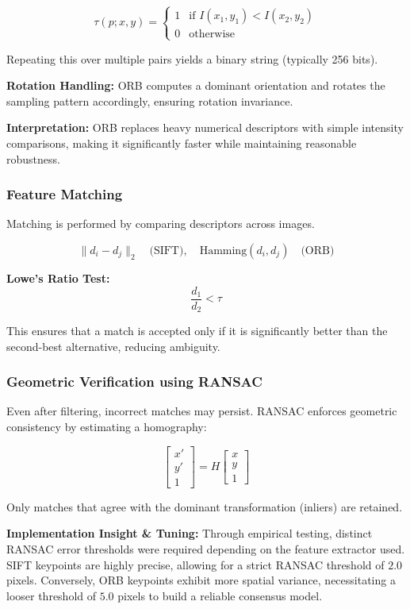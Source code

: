 \documentclass[conference]{IEEEtran}
\begin{document}
\[
\tau(p; x, y) =
\begin{cases}
1 & \text{if } I(x_1, y_1) < I(x_2, y_2) \\
0 & \text{otherwise}
\end{cases}
\]

Repeating this over multiple pairs yields a binary string (typically 256 bits).

\textbf{Rotation Handling:}  
ORB computes a dominant orientation and rotates the sampling pattern accordingly, ensuring rotation invariance.

\textbf{Interpretation:}  
ORB replaces heavy numerical descriptors with simple intensity comparisons, making it significantly faster while maintaining reasonable robustness.

\subsubsection{Feature Matching}

Matching is performed by comparing descriptors across images.

\[
\| d_i - d_j \|_2 \quad \text{(SIFT)}, \quad \text{Hamming}(d_i, d_j) \quad \text{(ORB)}
\]

\textbf{Lowe’s Ratio Test:}
\[
\frac{d_1}{d_2} < \tau
\]

This ensures that a match is accepted only if it is significantly better than the second-best alternative, reducing ambiguity.

\subsubsection{Geometric Verification using RANSAC}

Even after filtering, incorrect matches may persist. RANSAC enforces geometric consistency by estimating a homography:

\[
\begin{bmatrix}
x' \\
y' \\
1
\end{bmatrix}
=
H
\begin{bmatrix}
x \\
y \\
1
\end{bmatrix}
\]

Only matches that agree with the dominant transformation (inliers) are retained.

\textbf{Implementation Insight \& Tuning:}  
Through empirical testing, distinct RANSAC error thresholds were required depending on the feature extractor used. SIFT keypoints are highly precise, allowing for a strict RANSAC threshold of $2.0$ pixels. Conversely, ORB keypoints exhibit more spatial variance, necessitating a looser threshold of $5.0$ pixels to build a reliable consensus model. 
\end{document}
